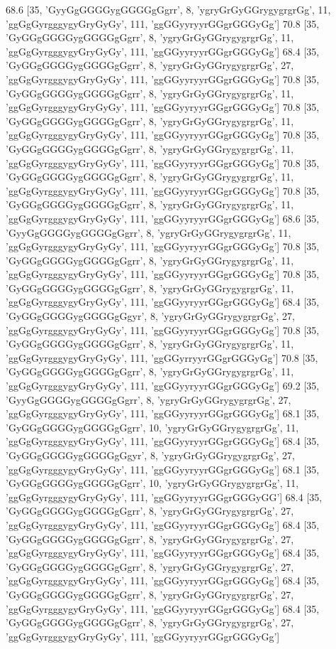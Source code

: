 68.6 [35, 'GyyGgGGGGygGGGGgGgrr', 8, 'ygryGrGyGGrygygrgrGg', 11, 'ggGgGyrgggygyGryGyGy', 111, 'ggGGyyryyrGGgrGGGyGg']
70.8 [35, 'GyGGgGGGGygGGGGgGgrr', 8, 'ygryGrGyGGrygygrgrGg', 11, 'ggGgGyrgggygyGryGyGy', 111, 'ggGGyyryyrGGgrGGGyGg']
68.4 [35, 'GyGGgGGGGygGGGGgGgrr', 8, 'ygryGrGyGGrygygrgrGg', 27, 'ggGgGyrgggygyGryGyGy', 111, 'ggGGyyryyrGGgrGGGyGg']
70.8 [35, 'GyGGgGGGGygGGGGgGgrr', 8, 'ygryGrGyGGrygygrgrGg', 11, 'ggGgGyrgggygyGryGyGy', 111, 'ggGGyyryyrGGgrGGGyGg']
70.8 [35, 'GyGGgGGGGygGGGGgGgrr', 8, 'ygryGrGyGGrygygrgrGg', 11, 'ggGgGyrgggygyGryGyGy', 111, 'ggGGyyryyrGGgrGGGyGg']
70.8 [35, 'GyGGgGGGGygGGGGgGgrr', 8, 'ygryGrGyGGrygygrgrGg', 11, 'ggGgGyrgggygyGryGyGy', 111, 'ggGGyyryyrGGgrGGGyGg']
70.8 [35, 'GyGGgGGGGygGGGGgGgrr', 8, 'ygryGrGyGGrygygrgrGg', 11, 'ggGgGyrgggygyGryGyGy', 111, 'ggGGyyryyrGGgrGGGyGg']
70.8 [35, 'GyGGgGGGGygGGGGgGgrr', 8, 'ygryGrGyGGrygygrgrGg', 11, 'ggGgGyrgggygyGryGyGy', 111, 'ggGGyyryyrGGgrGGGyGg']
68.6 [35, 'GyyGgGGGGygGGGGgGgrr', 8, 'ygryGrGyGGrygygrgrGg', 11, 'ggGgGyrgggygyGryGyGy', 111, 'ggGGyyryyrGGgrGGGyGg']
70.8 [35, 'GyGGgGGGGygGGGGgGgrr', 8, 'ygryGrGyGGrygygrgrGg', 11, 'ggGgGyrgggygyGryGyGy', 111, 'ggGGyyryyrGGgrGGGyGg']
70.8 [35, 'GyGGgGGGGygGGGGgGgrr', 8, 'ygryGrGyGGrygygrgrGg', 11, 'ggGgGyrgggygyGryGyGy', 111, 'ggGGyyryyrGGgrGGGyGg']
68.4 [35, 'GyGGgGGGGygGGGGgGgyr', 8, 'ygryGrGyGGrygygrgrGg', 27, 'ggGgGyrgggygyGryGyGy', 111, 'ggGGyyryyrGGgrGGGyGg']
70.8 [35, 'GyGGgGGGGygGGGGgGgrr', 8, 'ygryGrGyGGrygygrgrGg', 11, 'ggGgGyrgggygyGryGyGy', 111, 'ggGGyrryyrGGgrGGGyGg']
70.8 [35, 'GyGGgGGGGygGGGGgGgrr', 8, 'ygryGrGyGGrygygrgrGg', 11, 'ggGgGyrgggygyGryGyGy', 111, 'ggGGyyryyrGGgrGGGyGg']
69.2 [35, 'GyyGgGGGGygGGGGgGgrr', 8, 'ygryGrGyGGrygygrgrGg', 27, 'ggGgGyrgggygyGryGyGy', 111, 'ggGGyyryyrGGgrGGGyGg']
68.1 [35, 'GyGGgGGGGygGGGGgGgrr', 10, 'ygryGrGyGGrygygrgrGg', 11, 'ggGgGyrgggygyGryGyGy', 111, 'ggGGyyryyrGGgrGGGyGg']
68.4 [35, 'GyGGgGGGGygGGGGgGgyr', 8, 'ygryGrGyGGrygygrgrGg', 27, 'ggGgGyrgggygyGryGyGy', 111, 'ggGGyyryyrGGgrGGGyGg']
68.1 [35, 'GyGGgGGGGygGGGGgGgrr', 10, 'ygryGrGyGGrygygrgrGg', 11, 'ggGgGyrgggygyGryGyGy', 111, 'ggGGyyryyrGGgrGGGyGG']
68.4 [35, 'GyGGgGGGGygGGGGgGgrr', 8, 'ygryGrGyGGrygygrgrGg', 27, 'ggGgGyrgggygyGryGyGy', 111, 'ggGGyyryyrGGgrGGGyGg']
68.4 [35, 'GyGGgGGGGygGGGGgGgrr', 8, 'ygryGrGyGGrygygrgrGg', 27, 'ggGgGyrgggygyGryGyGy', 111, 'ggGGyyryyrGGgrGGGyGg']
68.4 [35, 'GyGGgGGGGygGGGGgGgrr', 8, 'ygryGrGyGGrygygrgrGg', 27, 'ggGgGyrgggygyGryGyGy', 111, 'ggGGyyryyrGGgrGGGyGg']
68.4 [35, 'GyGGgGGGGygGGGGgGgrr', 8, 'ygryGrGyGGrygygrgrGg', 27, 'ggGgGyrgggygyGryGyGy', 111, 'ggGGyyryyrGGgrGGGyGg']
68.4 [35, 'GyGGgGGGGygGGGGgGgrr', 8, 'ygryGrGyGGrygygrgrGg', 27, 'ggGgGyrgggygyGryGyGy', 111, 'ggGGyyryyrGGgrGGGyGg']
